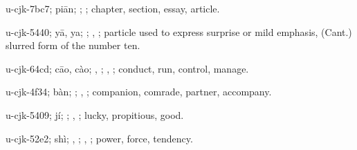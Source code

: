 \begin{multicols}{2}
{\cjkgGlue{}u-cjk-7bc7; piān; \cjkgGlue{}; \cjkgGlue{}; chapter, section, essay, article.

\cjkgGlue{}u-cjk-5440; yā, ya; \cjkgGlue{}; \cjkgGlue{}, \cjkgGlue{}; particle used to express surprise or mild emphasis, (Cant.) slurred form of the number ten.

\cjkgGlue{}u-cjk-64cd; cāo, cào; \cjkgGlue{}, \cjkgGlue{}\cjkgGlue{}\cjkgGlue{}; \cjkgGlue{}, \cjkgGlue{}; conduct, run, control, manage.

\cjkgGlue{}u-cjk-4f34; bàn; \cjkgGlue{}\cjkgGlue{}\cjkgGlue{}; \cjkgGlue{}, \cjkgGlue{}; companion, comrade, partner, accompany.

\cjkgGlue{}u-cjk-5409; jí; \cjkgGlue{}; \cjkgGlue{}, \cjkgGlue{}; lucky, propitious, good.

\cjkgGlue{}u-cjk-52e2; shì; \cjkgGlue{}\cjkgGlue{}\cjkgGlue{}, \cjkgGlue{}; \cjkgGlue{}, \cjkgGlue{}; power, force, tendency.

}
\end{multicols}
